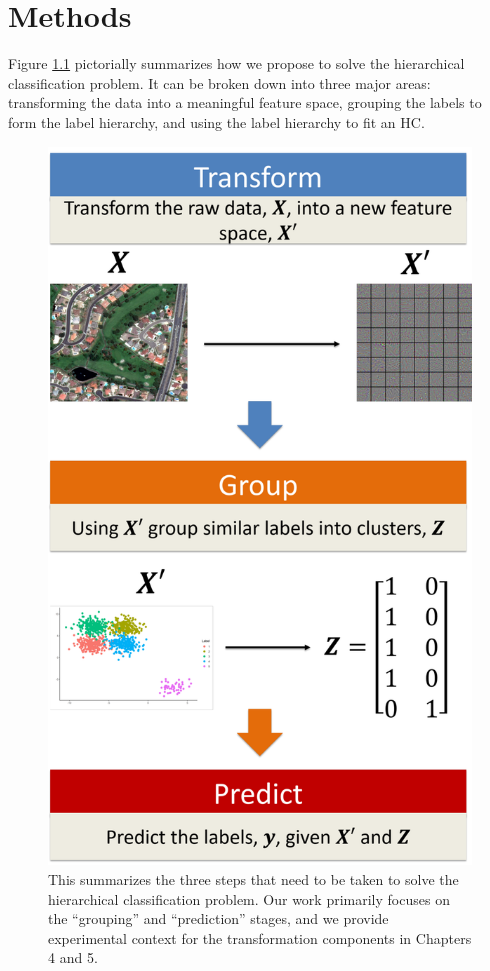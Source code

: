 \documentclass[../thesis.tex]{subfiles}
\begin{document}
\chapter{Methods}
Figure \ref{fig:hc-approach} pictorially summarizes how we propose to solve the
hierarchical classification problem. It can be broken down into three major
areas: transforming the data into a meaningful feature space, grouping the
labels to form the label hierarchy, and using the label hierarchy to fit an HC.
\begin{figure}
    \centering
    \includegraphics[width=.9\linewidth]{images/approach.pdf}
    \caption[Hierarchical Classification Approach]{This summarizes the three
    steps that need to be taken to solve the hierarchical classification
    problem. Our work primarily focuses on the ``grouping'' and ``prediction''
    stages, and we provide experimental context for the transformation
    components in Chapters 4 and 5.}
    \label{fig:hc-approach}
\end{figure}
\end{document}
